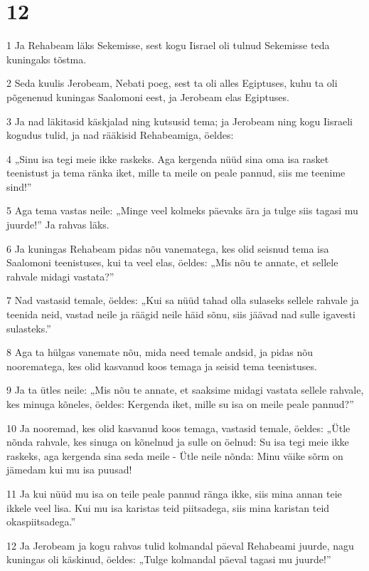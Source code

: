 \chapter{12}

\par 1 Ja Rehabeam läks Sekemisse, sest kogu Iisrael oli tulnud Sekemisse teda kuningaks tõstma.
\par 2 Seda kuulis Jerobeam, Nebati poeg, sest ta oli alles Egiptuses, kuhu ta oli põgenenud kuningas Saalomoni eest, ja Jerobeam elas Egiptuses.
\par 3 Ja nad läkitasid käskjalad ning kutsusid tema; ja Jerobeam ning kogu Iisraeli kogudus tulid, ja nad rääkisid Rehabeamiga, öeldes:
\par 4 „Sinu isa tegi meie ikke raskeks. Aga kergenda nüüd sina oma isa rasket teenistust ja tema ränka iket, mille ta meile on peale pannud, siis me teenime sind!”
\par 5 Aga tema vastas neile: „Minge veel kolmeks päevaks ära ja tulge siis tagasi mu juurde!” Ja rahvas läks.
\par 6 Ja kuningas Rehabeam pidas nõu vanematega, kes olid seisnud tema isa Saalomoni teenistuses, kui ta veel elas, öeldes: „Mis nõu te annate, et sellele rahvale midagi vastata?”
\par 7 Nad vastasid temale, öeldes: „Kui sa nüüd tahad olla sulaseks sellele rahvale ja teenida neid, vastad neile ja räägid neile häid sõnu, siis jäävad nad sulle igavesti sulasteks.”
\par 8 Aga ta hülgas vanemate nõu, mida need temale andsid, ja pidas nõu noorematega, kes olid kasvanud koos temaga ja seisid tema teenistuses.
\par 9 Ja ta ütles neile: „Mis nõu te annate, et saaksime midagi vastata sellele rahvale, kes minuga kõneles, öeldes: Kergenda iket, mille su isa on meile peale pannud?”
\par 10 Ja nooremad, kes olid kasvanud koos temaga, vastasid temale, öeldes: „Ütle nõnda rahvale, kes sinuga on kõnelnud ja sulle on öelnud: Su isa tegi meie ikke raskeks, aga kergenda sina seda meile - Ütle neile nõnda: Minu väike sõrm on jämedam kui mu isa puusad!
\par 11 Ja kui nüüd mu isa on teile peale pannud ränga ikke, siis mina annan teie ikkele veel lisa. Kui mu isa karistas teid piitsadega, siis mina karistan teid okaspiitsadega.”
\par 12 Ja Jerobeam ja kogu rahvas tulid kolmandal päeval Rehabeami juurde, nagu kuningas oli käskinud, öeldes: „Tulge kolmandal päeval tagasi mu juurde!”
